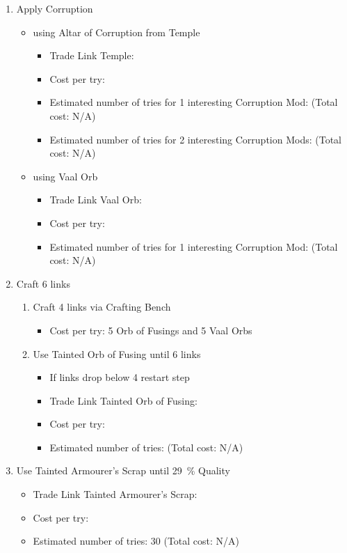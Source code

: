 \begin{enumerate}
	\item Apply Corruption
	\begin{itemize}
		\item using Altar of Corruption from Temple
		\begin{itemize}
			\item Trade Link Temple:
			\item Cost per try:
			\item Estimated number of tries for 1 interesting Corruption Mod: (Total cost: N/A)
			\item Estimated number of tries for 2 interesting Corruption Mods: (Total cost: N/A)
		\end{itemize}		
		\item using Vaal Orb
		\begin{itemize}
			\item Trade Link Vaal Orb:
			\item Cost per try:
			\item Estimated number of tries for 1 interesting Corruption Mod: (Total cost: N/A)
		\end{itemize}		
	\end{itemize}
	\item Craft 6 links
	\begin{enumerate}
		\item Craft 4 links via Crafting Bench
		\begin{itemize}
			\item Cost per try: 5 Orb of Fusings and 5 Vaal Orbs
		\end{itemize}		
		\item Use Tainted Orb of Fusing until 6 links
		\begin{itemize}
			\item If links drop below 4 restart step
			\item Trade Link Tainted Orb of Fusing:
			\item Cost per try:
			\item Estimated number of tries: (Total cost: N/A)
		\end{itemize}		
	\end{enumerate}
	\item Use Tainted Armourer's Scrap until \SI{29}{\percent} Quality
	\begin{itemize}
		\item Trade Link Tainted Armourer's Scrap:
		\item Cost per try:
		\item Estimated number of tries: 30 (Total cost: N/A)
	\end{itemize}		
\end{enumerate}

